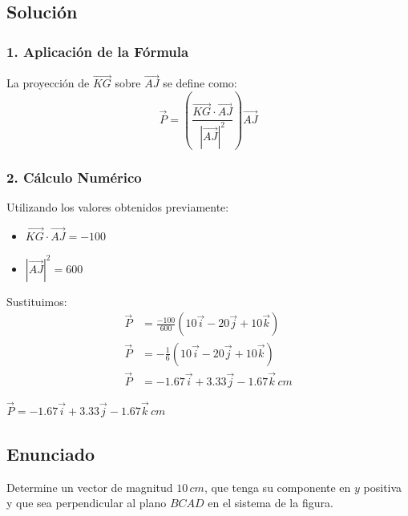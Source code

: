 \documentclass[12pt, a4paper]{article}
\begin{document}
\subsection*{Solución}

\subsubsection*{1. Aplicación de la Fórmula}
La proyección de $\vec{KG}$ sobre $\vec{AJ}$ se define como:
$$ \vec{P} = \left( \frac{\vec{KG} \cdot \vec{AJ}}{|\vec{AJ}|^2} \right) \vec{AJ} $$

\subsubsection*{2. Cálculo Numérico}
Utilizando los valores obtenidos previamente:
\begin{itemize}
    \item $\vec{KG} \cdot \vec{AJ} = -100$
    \item $|\vec{AJ}|^2 = 600$
\end{itemize}

Sustituimos:
\begin{align*}
    \vec{P} &= \frac{-100}{600} (10\vec{i} - 20\vec{j} + 10\vec{k}) \\
    \vec{P} &= -\frac{1}{6} (10\vec{i} - 20\vec{j} + 10\vec{k}) \\
    \vec{P} &= -1.67\vec{i} + 3.33\vec{j} - 1.67\vec{k} \, \si{cm}
\end{align*}

\begin{tcolorbox}[colback=green!5!white, colframe=green!50!black, title=Respuesta Final]
\centering \Large $\vec{P} = -1.67\vec{i} + 3.33\vec{j} - 1.67\vec{k} \, \si{cm}$
\end{tcolorbox}

\newpage

\subsection*{Enunciado}
Determine un vector de magnitud $10 \, \si{cm}$, que tenga su componente en $y$ positiva y que sea perpendicular al plano $BCAD$ en el sistema de la figura.
\end{document}
